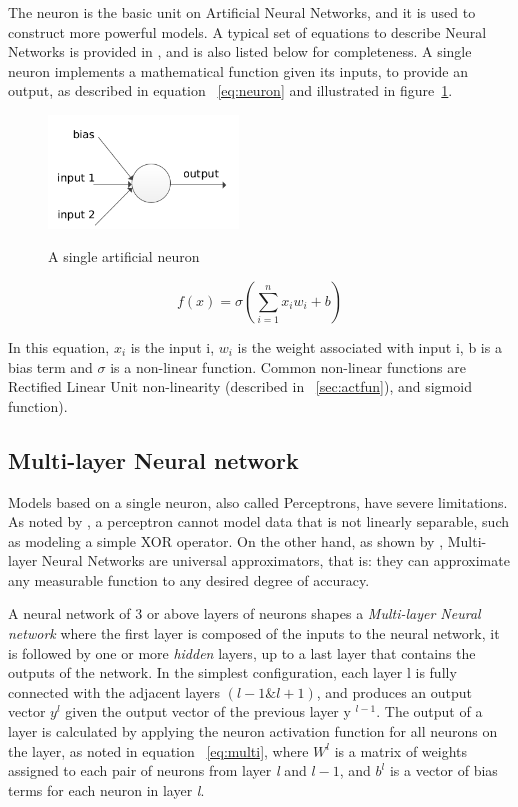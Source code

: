 The neuron is the basic unit on Artificial Neural Networks, and it is used to construct more powerful models. A typical set of equations to describe Neural Networks is provided in \cite{williams1986learning}, and is also listed below for completeness. A single neuron implements a mathematical function given its inputs, to provide an output, as described in equation ~\ref{eq:neuron} and illustrated in figure~\ref{fig:neuron}.

\begin{figure}[H]
	\centering
	{\includegraphics[width=0.45\textwidth]{images/neuron}}
	\caption{A single artificial neuron}
	\label{fig:neuron}
\end{figure}

\begin{equation}
f(x) = \sigma(\sum\limits_{i=1}^{n}x_iw_i + b) 
\label{eq:neuron}
\end{equation}

In this equation, $x_i$ is the input i, $w_i$ is the weight associated with input i, b is a bias term and $\sigma$ is a non-linear function. Common non-linear functions are Rectified Linear Unit non-linearity (described in ~\ref{sec:actfun}), and sigmoid function).

\subsection{Multi-layer Neural network}

Models based on a single neuron, also called Perceptrons, have severe limitations. As noted by \citeauthor{preparata2012computational}, a perceptron cannot model data that is not linearly separable, such as modeling a simple XOR operator. On the other hand, as shown by \citealt{hornik1989multilayer}, Multi-layer Neural Networks are universal approximators, that is: they can approximate any measurable function to any desired degree of accuracy.


A neural network of 3 or above layers of neurons shapes a \textit{Multi-layer Neural network} where the first layer is composed of the inputs to the neural network, it is followed by one or more \textit{hidden} layers, up to a last layer that contains the outputs of the network. In the simplest configuration, each layer l is fully connected with the adjacent layers $(l - 1 \& l + 1)$, and produces an output vector $y^{l}$ given the output vector of the previous layer y $^{l-1}$. The output of a layer is calculated by applying the neuron activation function for all neurons on the layer, as noted in equation ~\ref{eq:multi}, where $W^{l}$ is a matrix of weights assigned to each pair of neurons from layer \textit{l} and $l - 1$, and $b^{l}$ is a vector of bias terms for each neuron in layer \textit{l}.

